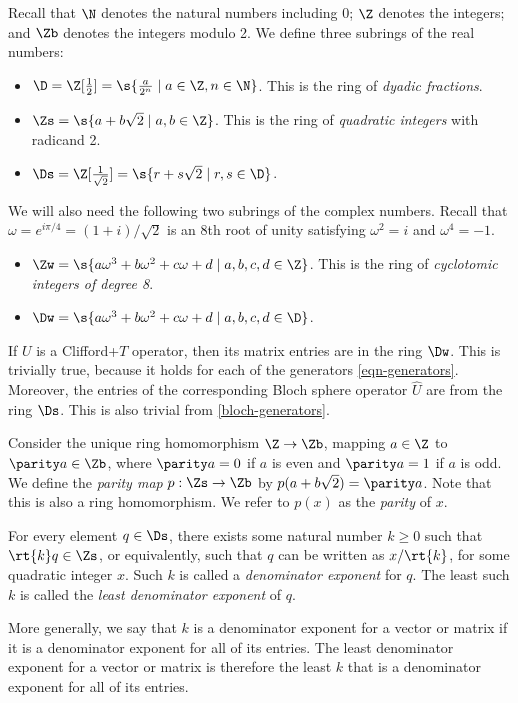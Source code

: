 \documentclass{article}
\begin{document}
\begin{definition}
  Recall that $\N$ denotes the natural numbers including 0; $\Z$
  denotes the integers; and $\Zb$ denotes the integers modulo 2.
  We define three subrings of the real numbers:
  \begin{itemize}
  \item $\D = \Z[\frac12] = \s{\frac{a}{2^n}\mid a\in\Z,
      n\in\N}$. This is the ring of {\em dyadic fractions}.
  \item $\Zs = \s{a+b\sqrt 2 \mid a,b\in\Z}$. This is the ring of {\em
      quadratic integers} with radicand 2.
  \item $\Ds = \Z[\frac1{\sqrt2}] = \s{r+s\sqrt 2 \mid r,s\in\D}$.
  \end{itemize}
  We will also need the following two subrings of the complex
  numbers. Recall that $\omega = e^{i\pi/4} = (1+i)/\sqrt{2}$ is an
  $8$th root of unity satisfying $\omega^2=i$ and $\omega^4=-1$.
  \begin{itemize}
  \item $\Zw = \s{a\omega^3+b\omega^2+c\omega+d \mid
      a,b,c,d\in\Z}$. This is the ring of {\em cyclotomic integers of
      degree 8}.
  \item $\Dw = \s{a\omega^3+b\omega^2+c\omega+d \mid a,b,c,d\in\D}$.
  \end{itemize}
\end{definition}

\begin{remark}\label{rem-necessary}
  If $U$ is a Clifford+$T$ operator, then its matrix entries are in
  the ring $\Dw$. This is trivially true, because it holds for each of
  the generators {\eqref{eqn-generators}}. Moreover, the entries of
  the corresponding Bloch sphere operator $\hat U$ are from the ring
  $\Ds$. This is also trivial from {\eqref{bloch-generators}}.
\end{remark}

\begin{definition}[Parity]
  Consider the unique ring homomorphism $\Z\to\Zb$, mapping $a\in\Z$
  to $\parity a\in\Zb$, where $\parity a=0$ if $a$ is even and
  $\parity a=1$ if $a$ is odd. We define the {\em parity map}
  $p:\Zs\to\Zb$ by $p(a+b\sqrt{2}) = \parity a$. Note that this is
  also a ring homomorphism. We refer to $p(x)$ as the {\em parity} of
  $x$.
\end{definition}

\begin{definition}\label{def-denomexp}
  For every element $q\in\Ds$, there exists some natural number $k\geq
  0$ such that $\rt{k}q\in\Zs$, or equivalently, such that $q$ can
  be written as $x/\rt{k}$, for some quadratic integer
  $x$. Such $k$ is called a {\em denominator exponent} for $q$. The
  least such $k$ is called the {\em least denominator exponent} of
  $q$.

  More generally, we say that $k$ is a denominator exponent for a
  vector or matrix if it is a denominator exponent for all of its
  entries. The least denominator exponent for a vector or matrix is
  therefore the least $k$ that is a denominator exponent for all of
  its entries.
\end{definition}
\end{document}
